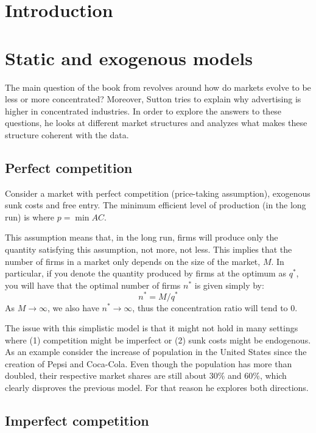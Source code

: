 \section{Introduction}



\section{Static and exogenous models}

The main question of the book from \cite{sutton_91} revolves around how do markets evolve to be less or more concentrated? Moreover, Sutton tries to explain why advertising is higher in concentrated industries. In order to explore the answers to these questions, he looks at different market structures and analyzes what makes these structure coherent with the data.

\subsection{Perfect competition}

Consider a market with perfect competition (price-taking assumption), exogenous sunk costs and free entry. The minimum efficient level of production (in the long run) is where $p = \min AC $. 

This assumption means that, in the long run, firms will produce only the quantity satisfying this assumption, not more, not less. This implies that the number of firms in a market only depends on the size of the market, $M$. In particular, if you denote the quantity produced by firms at the optimum as $q^*$, you will have that the optimal number of firms $n^*$ is given simply by: $$n^* = M/q^* $$
As $M\to\infty$, we also have $n^*\to\infty$, thus the concentration ratio will tend to 0.

The issue with this simplistic model is that it might not hold in many settings where (1) competition might be imperfect or (2) sunk costs might be endogenous. As an example consider the increase of population in the United States since the creation of Pepsi and Coca-Cola. Even though the population has more than doubled, their respective market shares are still about 30\% and 60\%, which clearly disproves the previous model. For that reason he explores both directions.

\subsection{Imperfect competition}

